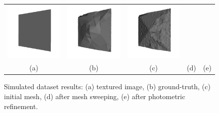 \begin{figure}[th]
\begin{tabular}{ccccc}
\includegraphics[height=0.18\textwidth]{./img/synth2_init}&
\includegraphics[height=0.18\textwidth]{./img/synth2_after_sweep}&
\includegraphics[height=0.18\textwidth]{./img/synth2_after_photo}\\
(a) &
(b)&
(c) &
(d) &
(e)\\
\end{tabular}
\caption{Simulated dataset results: (a) textured image, (b) ground-truth, (c) initial mesh, (d) after mesh sweeping, (e) after photometric refinement.}
\label{fig:simulated1}
\end{figure}



